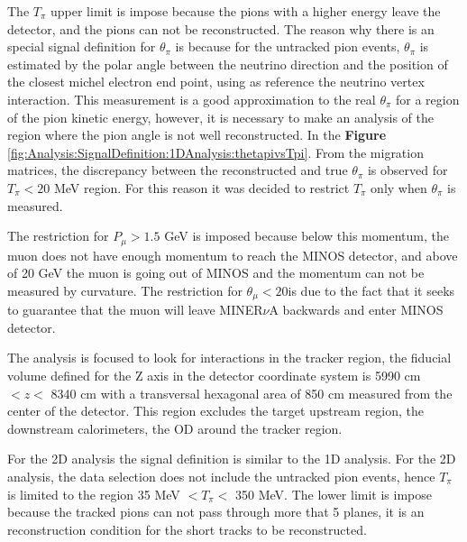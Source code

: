 The $T_\pi$ upper limit is impose because the pions with a higher energy leave the detector, and the pions can not be reconstructed. The reason why there is an special signal definition for $\theta_\pi$ is because for the untracked pion events, $\theta_\pi$ is estimated by the polar angle between the neutrino direction and the position of the closest michel electron end point, using as reference the neutrino vertex interaction. This measurement is a good approximation to the real $\theta_\pi$ for a region of the pion kinetic energy, however, it is necessary to make an analysis of the region where the pion angle is not well reconstructed. In the \textbf{Figure} \ref{fig:Analysis:SignalDefinition:1DAnalysis:thetapivsTpi}. From the migration matrices, the discrepancy between the reconstructed and true $\theta_\pi$ is observed for $T_\pi < 20$ MeV region. For this reason it was decided to restrict $T_\pi$ only when $\theta_\pi$ is measured. 

The restriction for $P_\mu>1.5$ GeV is imposed because below this momentum, the muon does not have enough momentum to reach the MINOS detector, and above of 20 GeV the muon is going out of MINOS and the momentum can not be measured by curvature. The restriction for $\theta_\mu < 20$\textdegree is due to the fact that it seeks to guarantee that the muon will leave MINER$\nu$A backwards and enter MINOS detector.

The analysis is focused to look for interactions in the tracker region, the fiducial volume defined for the Z axis in the detector coordinate system is 5990 cm $< z <$ 8340 cm with a transversal hexagonal area of 850 cm measured from the center of the detector. This region excludes the target upstream region, the downstream calorimeters, the OD around the tracker region. 

For the 2D analysis the signal definition is similar to the 1D analysis. For the 2D analysis, the data selection does not include the untracked pion events, hence $T_\pi$ is limited to the region 35 MeV $<T_\pi<$ 350 MeV. The lower limit is impose because the tracked pions can not pass through more that 5 planes, it is an reconstruction condition for the short tracks to be reconstructed. 


